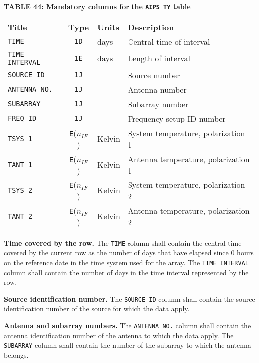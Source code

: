 \documentclass[twoside]{article}
\newcommand{\nif}{$n_{IF}$}
\begin{document}
\begin{center}
\underline{\bf{TABLE 44: Mandatory columns for the {\tt AIPS TY} table}}\\
\begin{tabular}{lcll}
\noalign{\vspace{2pt}} \label{ta:TYcols}
\underline{{\bf Title\vphantom{y}}} & \underline{\bf{Type}} &
   \underline{{\bf Units\vphantom{y}}} & \underline{\bf{Description}} \\
\noalign{\vspace{2pt}}
{\tt TIME}          & {\tt 1D} & days & Central time of interval \\
{\tt TIME INTERVAL} & {\tt 1E} & days & Length of interval \\
{\tt SOURCE ID}     & {\tt 1J} &      & Source number \\
{\tt ANTENNA NO.}   & {\tt 1J} &      & Antenna number \\
{\tt SUBARRAY}      & {\tt 1J} &      & Subarray number \\
{\tt FREQ ID}       & {\tt 1J} &      & Frequency setup ID number \\
{\tt TSYS 1}        & {\tt E}(\nif) & Kelvin & System temperature, polarization 1\\
{\tt TANT 1}        & {\tt E}(\nif) & Kelvin & Antenna temperature, polarization 1 \\
\hline
{\tt TSYS 2}        & {\tt E}(\nif) & Kelvin & System temperature, polarization 2\\
{\tt TANT 2}        & {\tt E}(\nif) & Kelvin & Antenna temperature, polarization 2
\end{tabular}
\end{center}

{\bf Time covered by the row.}  The {\tt TIME} column shall contain
the central time covered by the current row as the number of days
that have elapsed since 0 hours on the reference date in the time
system used for the array.  The {\tt TIME INTERVAL} column shall
contain the number of days in the time interval represented by the
row.

{\bf Source identification number.}  The {\tt SOURCE ID} column shall
contain the source identification number of the source for which the
data apply.

{\bf Antenna and subarray numbers.}  The {\tt ANTENNA NO.} column
shall contain the antenna identification number of the antenna to
which the data apply.  The {\tt SUBARRAY} column shall contain the
number of the subarray to which the antenna belongs.
\end{document}
